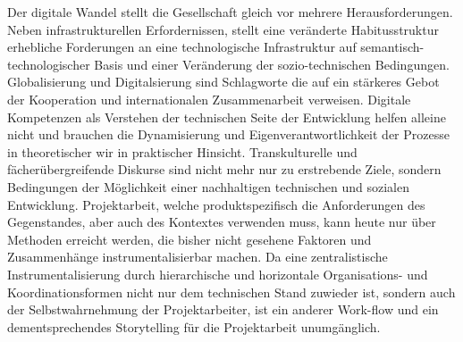 \documentclass[a4paper,11pt]{article}
\begin{document}
Der digitale Wandel stellt die Gesellschaft gleich vor mehrere
Herausforderungen.  Neben infrastrukturellen Erfordernissen, stellt eine
veränderte Habitusstruktur erhebliche Forderungen an eine technologische
Infrastruktur auf semantisch-technologischer Basis und einer Veränderung der
sozio-technischen Bedingungen. Globalisierung und Digitalsierung sind
Schlagworte die auf ein stärkeres Gebot der Kooperation und internationalen
Zusammenarbeit verweisen. Digitale Kompetenzen als Verstehen der technischen
Seite der Entwicklung helfen alleine nicht und brauchen die Dynamisierung und
Eigenverantwortlichkeit der Prozesse in theoretischer wir in praktischer
Hinsicht. Transkulturelle und fächerübergreifende Diskurse sind nicht mehr nur
zu erstrebende Ziele, sondern Bedingungen der Möglichkeit einer nachhaltigen
technischen und sozialen Entwicklung. Projektarbeit, welche produktspezifisch
die Anforderungen des Gegenstandes, aber auch des Kontextes verwenden muss,
kann heute nur über Methoden erreicht werden, die bisher nicht gesehene
Faktoren und Zusammenhänge instrumentalisierbar machen. Da eine
zentralistische Instrumentalisierung durch hierarchische und horizontale
Organisations- und Koordinationsformen nicht nur dem technischen Stand
zuwieder ist, sondern auch der Selbstwahrnehmung der Projektarbeiter, ist ein
anderer Work-flow und ein dementsprechendes Storytelling für die Projektarbeit
unumgänglich.
\end{document}
